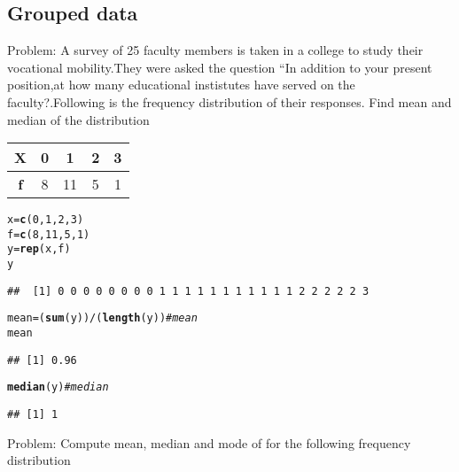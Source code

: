\documentclass{article}\usepackage[]{graphicx}\usepackage[]{xcolor}
\makeatletter
\newcommand{\hlnum}[1]{\textcolor[rgb]{0.686,0.059,0.569}{#1}}%
\newcommand{\hlcom}[1]{\textcolor[rgb]{0.678,0.584,0.686}{\textit{#1}}}%
\newcommand{\hlopt}[1]{\textcolor[rgb]{0,0,0}{#1}}%
\newcommand{\hldef}[1]{\textcolor[rgb]{0.345,0.345,0.345}{#1}}%
\newcommand{\hlkwb}[1]{\textcolor[rgb]{0.69,0.353,0.396}{#1}}%
\newcommand{\hlkwd}[1]{\textcolor[rgb]{0.737,0.353,0.396}{\textbf{#1}}}%
\newenvironment{kframe}{%
 \def\at@end@of@kframe{}%
 \ifinner\ifhmode%
  \def\at@end@of@kframe{\end{minipage}}%
  \begin{minipage}{\columnwidth}%
 \fi\fi%
 \def\FrameCommand##1{\hskip\@totalleftmargin \hskip-\fboxsep
 \colorbox{shadecolor}{##1}\hskip-\fboxsep
     \hskip-\linewidth \hskip-\@totalleftmargin \hskip\columnwidth}%
 \MakeFramed {\advance\hsize-\width
   \@totalleftmargin\z@ \linewidth\hsize
   \@setminipage}}%
 {\par\unskip\endMakeFramed%
 \at@end@of@kframe}
\newenvironment{knitrout}{}{} %
\makeatother
\begin{document}
\subsection{Grouped data}
Problem:
A survey of 25 faculty members is taken in a college to study their
vocational mobility.They were asked the question “In addition to your present
position,at how many educational instistutes have served on the
faculty?.Following is the frequency distribution of their responses. Find mean and median of the distribution
\begin{table}[!ht]
    \centering
    \begin{tabular}{|c|c|c|c|c|}
    \hline
        \textbf{X} & 0 & 1 & 2 & 3 \\ \hline
        \textbf{f} & 8 & 11 & 5 & 1 \\ \hline
    \end{tabular}
\end{table}
\begin{knitrout}
\color{fgcolor}\begin{kframe}
\begin{alltt}
\hldef{x}\hlkwb{=}\hlkwd{c}\hldef{(}\hlnum{0}\hldef{,}\hlnum{1}\hldef{,}\hlnum{2}\hldef{,}\hlnum{3}\hldef{)}
\hldef{f}\hlkwb{=}\hlkwd{c}\hldef{(}\hlnum{8}\hldef{,}\hlnum{11}\hldef{,}\hlnum{5}\hldef{,}\hlnum{1}\hldef{)}
\hldef{y}\hlkwb{=}\hlkwd{rep}\hldef{(x,f)}
\hldef{y}
\end{alltt}
\begin{verbatim}
##  [1] 0 0 0 0 0 0 0 0 1 1 1 1 1 1 1 1 1 1 1 2 2 2 2 2 3
\end{verbatim}
\begin{alltt}
\hldef{mean}\hlkwb{=}\hldef{(}\hlkwd{sum}\hldef{(y))}\hlopt{/}\hldef{(}\hlkwd{length}\hldef{(y))} \hlcom{#mean}
\hldef{mean}
\end{alltt}
\begin{verbatim}
## [1] 0.96
\end{verbatim}
\begin{alltt}
\hlkwd{median}\hldef{(y)} \hlcom{#median}
\end{alltt}
\begin{verbatim}
## [1] 1
\end{verbatim}
\end{kframe}
\end{knitrout}
Problem: Compute mean, median and mode of for the following frequency
distribution
\end{document}
